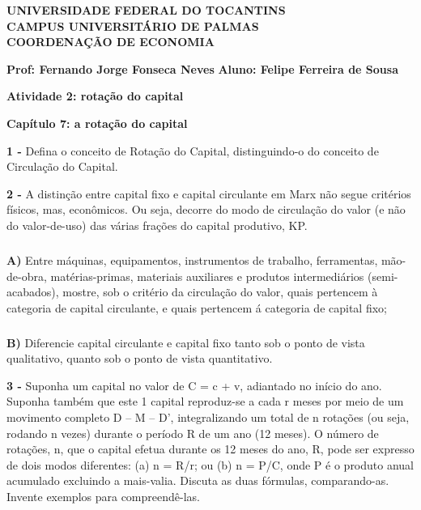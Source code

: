 \documentclass[a4paper, 12pt]{article} %
\begin{document}
\begin{center}
\textbf{UNIVERSIDADE FEDERAL DO TOCANTINS\\
	CAMPUS UNIVERSITÁRIO DE PALMAS\\
	COORDENAÇÃO DE ECONOMIA}
\end{center}

\textbf{Prof: Fernando Jorge Fonseca Neves }
\singlespacing
\textbf{Aluno: Felipe Ferreira de Sousa}
\begin{center}
\textbf{Atividade 2: rotação do capital}
\end{center}
\vspace{0.5cm}

\begin{center}
\textbf{Capítulo 7: a rotação do capital}
\end{center}

\par \textbf{1 -} Defina o conceito de Rotação do Capital, distinguindo-o do conceito de Circulação do Capital.
\vspace{0.5cm}
\par \textbf{2 - } A distinção entre capital fixo e capital circulante em Marx não segue critérios físicos, mas,
econômicos. Ou seja, decorre do modo de circulação do valor (e não do valor-de-uso) das várias frações
do capital produtivo, KP.

\subparagraph{} \textbf{A)} Entre máquinas, equipamentos, instrumentos de trabalho, ferramentas, mão-de-obra,
matérias-primas, materiais auxiliares e produtos intermediários (semi-acabados), mostre, sob o
critério da circulação do valor, quais pertencem à categoria de capital circulante, e quais
pertencem á categoria de capital fixo;

\subparagraph{} \textbf{B)} Diferencie capital circulante e capital fixo tanto sob o ponto de vista qualitativo, quanto sob o
ponto de vista quantitativo.

\vspace{0.5cm}

\par \textbf{3 - } Suponha um capital no valor de C = c + v, adiantado no início do ano. Suponha também que este
1
capital reproduz-se a cada r meses por meio de um movimento completo D – M – D’, integralizando um
total de n rotações (ou seja, rodando n vezes) durante o período R de um ano (12 meses). O número de
rotações, n, que o capital efetua durante os 12 meses do ano, R, pode ser expresso de dois modos
diferentes: (a) n = R/r; ou (b) n = P/C, onde P é o produto anual acumulado excluindo a mais-valia.
Discuta as duas fórmulas, comparando-as. Invente exemplos para compreendê-las.
\end{document}
